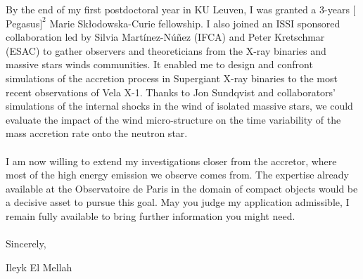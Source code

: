 \documentclass[12pt]{letter}
\begin{document}
\begin{letter} {}
\hspace*{0.5cm} By the end of my first postdoctoral year in KU Leuven, I was granted a 3-years $[$Pegasus$]^2$ Marie Sk\l{}odowska-Curie fellowship. I also joined an ISSI sponsored collaboration led by Silvia Mart\'{i}nez-N\'{u}\~{n}ez (IFCA) and Peter Kretschmar (ESAC) to gather observers and theoreticians from the X-ray binaries and massive stars winds communities. It enabled me to design and confront simulations of the accretion process in Supergiant X-ray binaries to the most recent observations of Vela X-1. Thanks to Jon Sundqvist and collaborators' simulations of the internal shocks in the wind of isolated massive stars, we could evaluate the impact of the wind micro-structure on the time variability of the mass accretion rate onto the neutron star.\\ \\
\hspace*{0.5cm} I am now willing to extend my investigations closer from the accretor, where most of the high energy emission we observe comes from. The expertise already available at the Observatoire de Paris in the domain of compact objects would be a decisive asset to pursue this goal. May you judge my application admissible, I remain fully available to bring further information you might need.\\ \\
 
Sincerely,
 
\closing{Ileyk El Mellah} 


  \end{letter}
  
  
 
\end{document}

